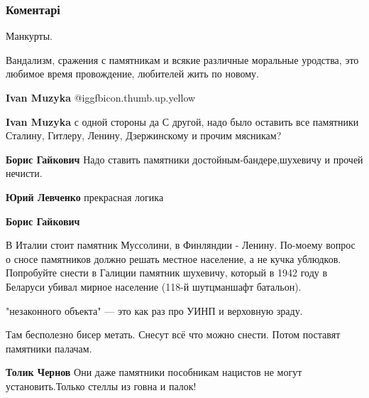  
 
 
 
 
\subsubsection{Коментарі}
\label{sec:14_11_2021.fb.dolinskij_eduard.1.lohvica_pamjatnik_komsomol.cmt}

\begin{itemize} %
Манкурты.

Вандализм, сражения с памятникам и всякие различные моральные уродства, это
любимое время провождение, любителей жить по новому.

\begin{itemize} %
\textbf{Ivan Muzyka}  @igg{fbicon.thumb.up.yellow} 

\textbf{Ivan Muzyka} с одной стороны да
С другой, надо было оставить все памятники Сталину, Гитлеру, Ленину, Дзержинскому и прочим мясникам?

\textbf{Борис Гайкович} Надо ставить памятники достойным-бандере,шухевичу и прочей нечисти.

\textbf{Юрий Левченко} прекрасная логика

\textbf{Борис Гайкович} 

В Италии стоит памятник Муссолини, в Финляндии - Ленину. По-моему вопрос о сносе
памятников должно решать местное население, а не кучка ублюдков. Попробуйте
снести в Галиции памятник шухевичу, который в 1942 году в Беларуси убивал мирное
население (118-й шутцманшафт батальон).

\end{itemize} %

"незаконного объекта" — это как раз про УИНП и верховную зраду.

Там бесполезно бисер метать. Снесут всё что можно снести. Потом поставят памятники палачам.

\begin{itemize} %
\textbf{Толик Чернов} Они даже памятники пособникам нацистов не могут установить.Только стеллы из говна и палок!
\end{itemize} %


\end{itemize}
